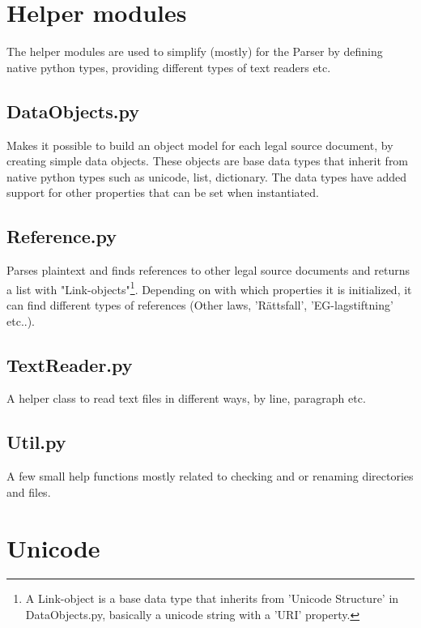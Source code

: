 \section{Helper modules}

The helper modules are used to simplify (mostly) for the Parser by defining native python types, providing different types of text readers etc.  

\subsection{DataObjects.py}

Makes it possible to build an object model for each legal source document, by
creating simple data objects. These objects are base data types that inherit
from native python types such as unicode, list, dictionary. The data types have
added support for other properties that can be set when instantiated.

\subsection{Reference.py}

Parses plaintext and finds references to other legal source documents and
returns a list with "Link-objects"\footnote{A Link-object is a base data type
that inherits from 'Unicode Structure' in DataObjects.py, basically a unicode
string with a 'URI' property.}. Depending on with which properties it is
initialized, it can find different types of references (Other laws,
'Rättsfall', 'EG-lagstiftning' etc..).

\subsection{TextReader.py}
A helper class to read text files in different ways, by line, paragraph etc.\cite{pythonBib}  

\subsection{Util.py}

A few small help functions mostly related to checking and or renaming directories and files. 

\section{Unicode}

